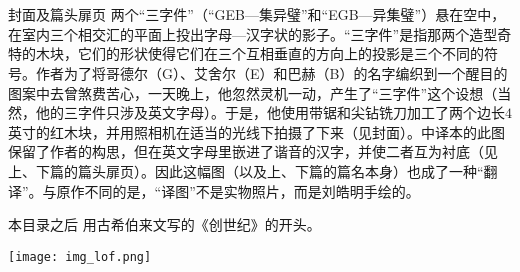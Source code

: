 
\chapter{\listfigurename}

\begin{lof}

\item[封面及篇头扉页]两个“三字件”（“GEB—集异璧”和“EGB—异集璧”）悬在空中，在室内三个相交汇的平面上投出字母—汉字状的影子。“三字件”是指那两个造型奇特的木块，它们的形状使得它们在三个互相垂直的方向上的投影是三个不同的符号。作者为了将哥德尔（G）、艾舍尔（E）和巴赫（B）的名字编织到一个醒目的图案中去曾煞费苦心，一天晚上，他忽然灵机一动，产生了“三字件”这个设想（当然，他的三字件只涉及英文字母）。于是，他使用带锯和尖钻铣刀加工了两个边长$4$英寸的红木块，并用照相机在适当的光线下拍摄了下来（见封面）。中译本的此图保留了作者的构思，但在英文字母里嵌进了谐音的汉字，并使二者互为衬底（见上、下篇的篇头扉页）。因此这幅图（以及上、下篇的篇名本身）也成了一种“翻译”。与原作不同的是，“译图”不是实物照片，而是刘皓明手绘的。

\item[本目录之后]用古希伯来文写的《创世纪》的开头。

\listoffigures

\end{lof}

\bigskip

\begin{center}
\texttt{[image: img\_lof.png]}
\end{center}
